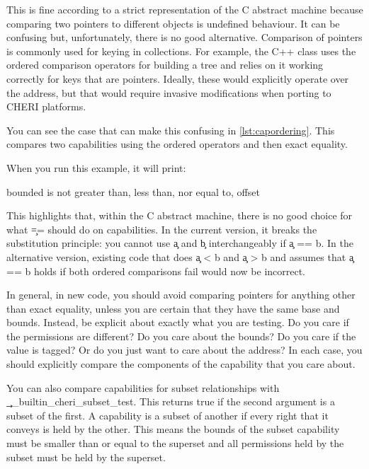 {{{{{{{{This is fine according to a strict representation of the C abstract machine because comparing two pointers to different objects is undefined behaviour.
It can be confusing but, unfortunately, there is no good alternative.
Comparison of pointers is commonly used for keying in collections.
For example, the C++  class uses the ordered comparison operators for building a tree and relies on it working correctly for keys that are pointers.
Ideally, these would explicitly operate over the address, but that would require invasive modifications when porting to CHERI platforms.

You can see the case that can make this confusing in \ref{lst:capordering}.
This compares two capabilities using the ordered operators and then exact equality.

\codelisting[filename=examples/compare_capabilities/example.c,marker=capability_ordering,label=lst:capordering,caption="Trying to construct an ordering over two capabilities."]{}

When you run this example, it will print:

\begin{console}
bounded is not greater than, less than, nor equal to, offset
\end{console}

This highlights that, within the C abstract machine, there is no good choice for what \c{==} should do on capabilities.
In the current version, it breaks the substitution principle: you cannot use \c{a} and \c{b} interchangeably if \c{a == b}.
In the alternative version, existing code that does \c{a < b} and \c{a > b} and assumes that \c{a == b} holds if both ordered comparisons fail would now be incorrect.

In general, in new code, you should avoid comparing pointers for anything other than exact equality, unless you are certain that they have the same base and bounds.
Instead, be explicit about exactly what you are testing.
Do you care if the permissions are different?
Do you care about the bounds?
Do you care if the value is tagged?
Or do you just want to care about the address?
In each case, you should explicitly compare the components of the capability that you care about.

You can also compare capabilities for subset relationships with \c{__builtin_cheri_subset_test}.
This returns true if the second argument is a subset of the first.
A capability is a subset of another if every right that it conveys is held by the other.
This means the bounds of the subset capability must be smaller than or equal to the superset and all permissions held by the subset must be held by the superset.

}}}}}}}}
